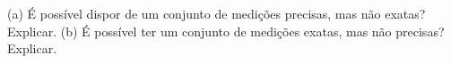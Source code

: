 (a) É possível dispor de um conjunto de medições precisas, mas não exatas? Explicar. (b) É possível ter um conjunto de medições exatas, mas não precisas? Explicar.


